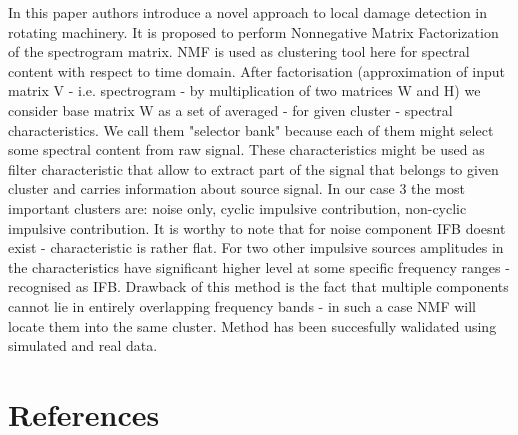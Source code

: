 \documentclass[preprint,12pt]{elsarticle}
\begin{document}
In this paper authors introduce a novel approach to local damage detection in rotating machinery. It is proposed to perform Nonnegative Matrix Factorization of the spectrogram matrix. NMF is used as clustering tool here for spectral content with respect to time domain. After factorisation (approximation of input matrix V - i.e. spectrogram - by multiplication of two matrices W and H)  we consider base matrix W as a set of averaged - for given cluster - spectral characteristics. We call them "selector bank" because each of them might select some spectral content from raw signal. These characteristics might be used as filter characteristic that allow to extract part of the signal that belongs to given cluster and carries information about source signal. In our case 3 the most important clusters are: noise only, cyclic impulsive contribution, non-cyclic impulsive contribution. It is worthy to note that for noise component IFB doesnt exist - characteristic is rather flat. For two other impulsive sources amplitudes in the characteristics have significant higher level at some specific frequency ranges - recognised as IFB. Drawback of this method is the fact that multiple components cannot lie in entirely overlapping frequency bands - in such a case NMF will locate them into the same cluster. Method has been succesfully walidated using simulated and real data.



\section*{References}
% 

\end{document}
